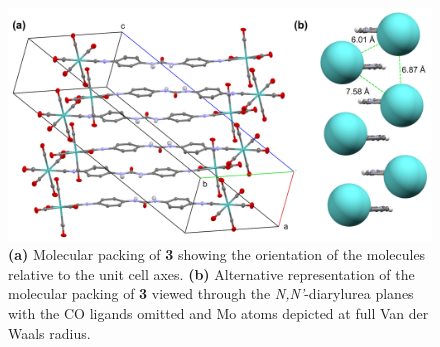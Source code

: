 \begin{figure}[h!]
    \centering
    \includegraphics[width=0.8\linewidth]{figures/pub2/molecular-packing.png}
    \caption{\textbf{(a)} Molecular packing of \textbf{3} showing the orientation of the molecules relative to the unit cell axes. \textbf{(b)} Alternative representation of the molecular packing of  \textbf{3} viewed through the \textit{N,N'}-diarylurea planes with the CO ligands omitted and Mo atoms depicted at full Van der Waals radius.}\label{molecular-packing}
\end{figure}

